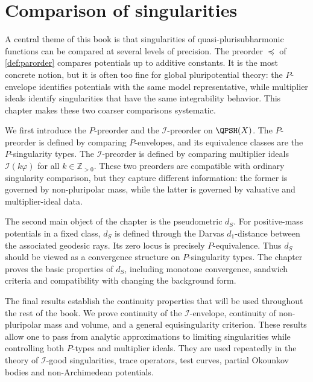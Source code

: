 \chapter{Comparison of singularities}
\label{chap:comp}

A central theme of this book is that singularities of quasi-plurisubharmonic functions can be compared at several levels of precision. The preorder $\preceq$ of \cref{def:parorder} compares potentials up to additive constants. It is the most concrete notion, but it is often too fine for global pluripotential theory: the $P$-envelope identifies potentials with the same model representative, while multiplier ideals identify singularities that have the same integrability behavior. This chapter makes these two coarser comparisons systematic.

We first introduce the $P$-preorder and the $\mathcal I$-preorder on $\QPSH(X)$. The $P$-preorder is defined by comparing $P$-envelopes, and its equivalence classes are the $P$-singularity types. The $\mathcal I$-preorder is defined by comparing multiplier ideals $\mathcal I(k\varphi)$ for all $k\in\mathbb Z_{>0}$. These two preorders are compatible with ordinary singularity comparison, but they capture different information: the former is governed by non-pluripolar mass, while the latter is governed by valuative and multiplier-ideal data.

The second main object of the chapter is the pseudometric $d_S$. For positive-mass potentials in a fixed class, $d_S$ is defined through the Darvas $d_1$-distance between the associated geodesic rays. Its zero locus is precisely $P$-equivalence. Thus $d_S$ should be viewed as a convergence structure on $P$-singularity types. The chapter proves the basic properties of $d_S$, including monotone convergence, sandwich criteria and compatibility with changing the background form.

The final results establish the continuity properties that will be used throughout the rest of the book. We prove continuity of the $\mathcal I$-envelope, continuity of non-pluripolar mass and volume, and a general equisingularity criterion. These results allow one to pass from analytic approximations to limiting singularities while controlling both $P$-types and multiplier ideals. They are used repeatedly in the theory of $\mathcal I$-good singularities, trace operators, test curves, partial Okounkov bodies and non-Archimedean potentials.

